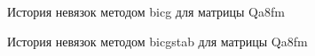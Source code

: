 \begin{figure}[h!]
    \renewcommand{\figurename}{Рисунок}
    \caption{История невязок методом bicg для матрицы Qa8fm}
    \label{fig:image}
\end{figure}

\begin{figure}
    \renewcommand{\figurename}{Рисунок}
    \caption{История невязок методом bicgstab для матрицы Qa8fm}
    \label{fig:image}
\end{figure}

